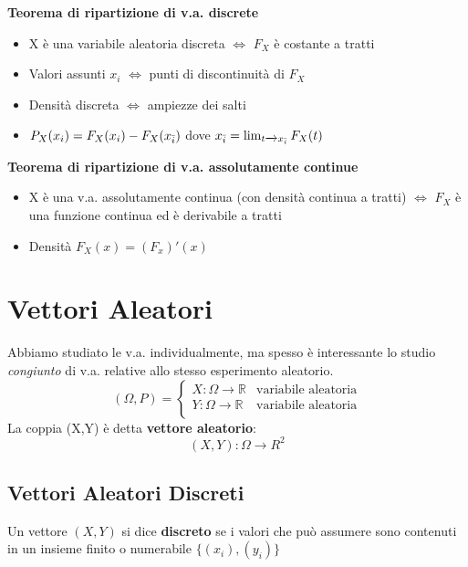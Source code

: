 \noindent \textbf{Teorema di ripartizione di v.a. discrete} 
\begin{itemize}
    \item X è una variabile aleatoria discreta $\iff$ $F_X$ è costante a tratti 
    \item Valori assunti {$x_i$} $\iff$ punti di discontinuità di $F_X$ 
    \item Densità discreta $\iff$ ampiezze dei salti \item $P_X(x_i) = F_X(x_i) - F_X(x_{\Bar{i}}) $ dove $x_{\Bar{i}} = \lim_{t \xrightarrow{} x_{\Bar{i}}} F_X(t)$
\end{itemize} 

\noindent \textbf{Teorema di ripartizione di v.a. assolutamente continue}
\begin{itemize}
    \item X è una v.a. assolutamente continua (con densità continua a tratti) $\iff$ $F_X$ è una funzione continua ed è derivabile a tratti
    \item Densità $F_X (x) = (F_x)'(x)$
\end{itemize}

\section{Vettori Aleatori}

Abbiamo studiato le v.a. individualmente, ma spesso è interessante lo studio \textit{congiunto} di v.a. relative allo stesso esperimento aleatorio. 
\begin{equation}
  (\Omega, P) =
    \begin{cases}
      X: \Omega \xrightarrow{} \mathbb{R} & \text{variabile aleatoria}\\
      Y: \Omega \xrightarrow{} \mathbb{R} & \text{variabile aleatoria}\\
    \end{cases}       
\end{equation}
La coppia (X,Y) è detta \textbf{vettore aleatorio}: $$(X,Y) : \Omega \xrightarrow{} R^2$$

\subsection{Vettori Aleatori Discreti}

Un vettore $(X,Y)$ si dice \textbf{discreto} se i valori che può assumere sono contenuti in un insieme finito o numerabile $\{(x_i),(y_i)\}$ \newline

